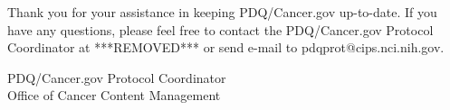 \documentclass[letterpaper,12pt]{letter}
\begin{document}
Thank you for your assistance in keeping PDQ/Cancer.gov up-to-date.  If you
have any questions, please feel free to contact the PDQ/Cancer.gov Protocol
Coordinator at ***REMOVED*** or send e-mail to pdqprot@cips.nci.nih.gov.

\vspace{12pt}

PDQ/Cancer.gov Protocol Coordinator \\
Office of Cancer Content Management

\vfill
\end{document}

